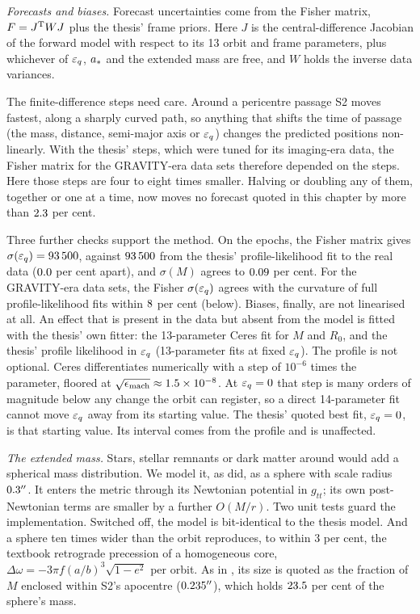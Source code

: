 \emph{Forecasts and biases.} Forecast uncertainties come from the Fisher
matrix, $F = J^{\rm T} W J$ plus the thesis' frame priors. Here $J$ is the
central-difference Jacobian of the forward model with respect to its 13 orbit
and frame parameters, plus whichever of $\varepsilon_q$, $a_*$ and the extended
mass are free, and $W$ holds the inverse data variances.

The finite-difference steps need care. Around a pericentre passage S2 moves
fastest, along a sharply curved path, so anything
that shifts the time of passage (the mass, distance, semi-major axis or
$\varepsilon_q$) changes the predicted positions non-linearly. With the thesis' steps,
which were tuned for its imaging-era data, the Fisher matrix for the
GRAVITY-era data sets therefore depended on the steps. Here those steps are
four to eight times smaller. Halving or doubling any of them, together or one
at a time, now moves no forecast quoted in this chapter by more than
$2.3$ per cent.

Three further checks support the method. On the \citet{Gillessen2017} epochs,
the Fisher matrix gives $\sigma(\varepsilon_q) = 93\,500$, against
$93\,500$ from the thesis' profile-likelihood fit to the real data
($0.0$ per cent apart), and $\sigma(M)$ agrees to $0.09$
per cent. For the GRAVITY-era data sets, the Fisher $\sigma(\varepsilon_q)$ agrees
with the curvature of full profile-likelihood fits within $8$
per cent (below). Biases, finally, are not linearised at all. An effect that
is present in the data but absent from the model is fitted with the thesis'
own fitter: the 13-parameter Ceres fit for $M$ and $R_0$, and the thesis'
profile likelihood in $\varepsilon_q$ (13-parameter fits at fixed $\varepsilon_q$). The
profile is not optional. Ceres differentiates numerically with a step of
$10^{-6}$ times the parameter, floored at $\sqrt{\epsilon_{\rm mach}} \approx
1.5\times10^{-8}$. At $\varepsilon_q = 0$ that step is many orders of magnitude below
any change the orbit can register, so a direct 14-parameter fit cannot move
$\varepsilon_q$ away from its starting value. The thesis' quoted best fit,
$\varepsilon_q = 0$, is that starting value. Its interval comes from the profile and
is unaffected.

\emph{The extended mass.} Stars, stellar remnants or dark matter around \sgra{}
would add a spherical mass distribution. We model it, as \citet{Gravity2020}
did, as a \citet{Plummer1911} sphere with scale radius $0.3''$. It
enters the metric through its Newtonian potential in $g_{tt}$; its own
post-Newtonian terms are smaller by a further $O(M/r)$. Two unit tests guard
the implementation. Switched off, the model is bit-identical to the thesis
model. And a sphere ten times wider than the orbit reproduces, to within
3 per cent, the textbook retrograde precession of a homogeneous core,
$\Delta\omega = -3\pi f (a/b)^3\sqrt{1-e^2}$ per orbit. As in
\citet{Gravity2022}, its size is quoted as the fraction of $M$ enclosed
within S2's apocentre ($0.235''$), which holds $23.5$ per cent of the
sphere's mass.

